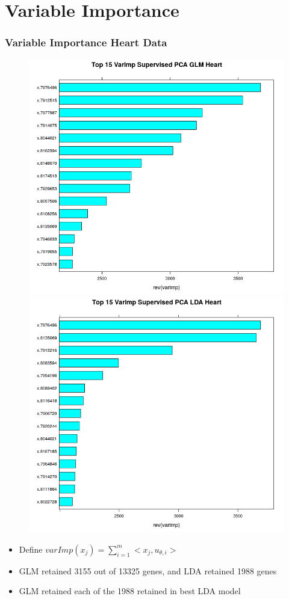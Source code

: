 \documentclass[11pt]{beamer}
\begin{document}
\section{Variable Importance}
\begin{frame}
\frametitle{Variable Importance Heart Data}
{

\begin{figure}
\includegraphics[scale=0.2]{heartVarImp_glm.png}
\includegraphics[scale=0.2]{heartVarImp_lda.png}
\end{figure}

\begin{itemize}
\item Define $varImp(x_j) = \sum_{i=1}^m <x_j, u_{\theta, i} >$
\item GLM retained 3155 out of 13325 genes, and LDA retained 1988 genes
\item GLM retained each of the 1988 retained in best LDA model
\end{itemize}
}
\end{frame}
\end{document}
